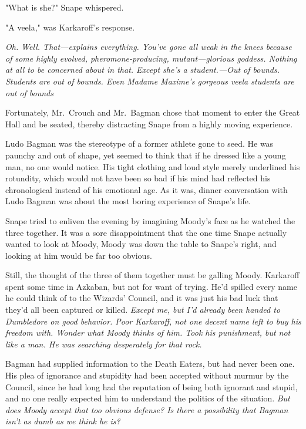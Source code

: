 "What is she?" Snape whispered.

"A veela," was Karkaroff's response.

\emph{Oh. Well. That—explains everything. You've gone all{\el} weak in the knees because of some{\el} highly evolved, pheromone-producing, mutant—glorious goddess. Nothing at all to be concerned about in that. Except she's a student.—Out of bounds. Students are out of bounds. Even Madame Maxime's gorgeous veela students are{\el} out of{\el} bounds{\el}}

Fortunately, Mr.~Crouch and Mr.~Bagman chose that moment to enter the Great Hall and be seated, thereby distracting Snape from a highly{\el} moving{\el} experience.

Ludo Bagman was the stereotype of a former athlete gone to seed. He was paunchy and out of shape, yet seemed to think that if he dressed like a young man, no one would notice. His tight clothing and loud style merely underlined his rotundity, which would not have been so bad if his mind had reflected his chronological instead of his emotional age. As it was, dinner conversation with Ludo Bagman was about the most boring experience of Snape's life.

Snape tried to enliven the evening by imagining Moody's face as he watched the three together. It was a sore disappointment that the one time Snape actually wanted to look at Moody, Moody was down the table to Snape's right, and looking at him would be far too obvious.

Still, the thought of the three of them together must be galling Moody. Karkaroff spent some time in Azkaban, but not for want of trying. He'd spilled every name he could think of to the Wizards' Council, and it was just his bad luck that they'd all been captured or killed. \emph{Except me, but I'd already been handed to Dumbledore on good behavior. Poor Karkaroff, not one decent name left to buy his freedom with. Wonder what Moody thinks of him. Took his punishment, but not like a man. He was searching desperately for that rock.}

Bagman had supplied information to the Death Eaters, but had never been one. His plea of ignorance and stupidity had been accepted without murmur by the Council, since he had long had the reputation of being both ignorant and stupid, and no one really expected him to understand the politics of the situation. \emph{But does Moody accept that too obvious defense? Is there a possibility that Bagman isn't as dumb as we think he is?}

